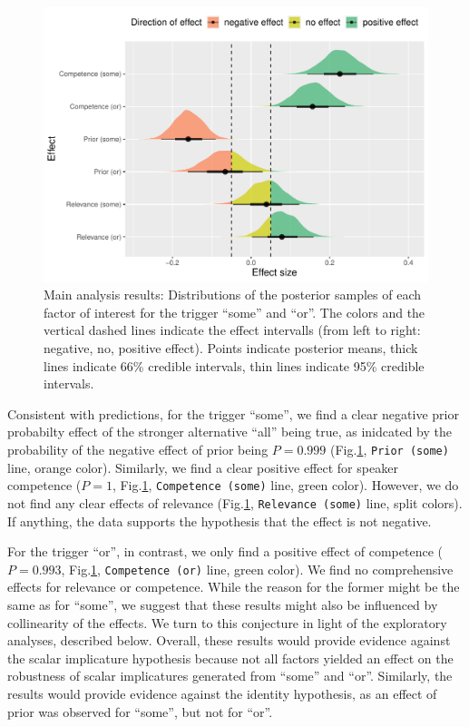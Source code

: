 \documentclass{sp}
\begin{document}
\begin{figure}[h]
	\begin{center}
		\includegraphics[width=1\linewidth]{images/posterior-effects-main.pdf}
	\end{center}
	\vspace{-0.3cm}
	\caption{Main analysis results: Distributions of the posterior samples of each factor of interest for the trigger ``some'' and ``or''. The colors and the vertical dashed lines indicate the effect intervalls (from left to right: negative, no, positive effect). Points indicate posterior means, thick lines indicate 66\% credible intervals, thin lines indicate 95\% credible intervals.}
	\label{posteriors-main}
\end{figure}

Consistent with predictions, for the trigger ``some'', we find a clear negative prior probabilty effect of the stronger alternative ``all'' being true, as inidcated by the probability of the negative effect of prior being $P = 0.999$ (Fig.\ref{posteriors-main}, \texttt{Prior~(some)} line, orange color). Similarly, we find a clear positive effect for speaker competence ($P =  1$, Fig.\ref{posteriors-main}, \texttt{Competence~(some)} line, green color). However, we do not find any clear effects of relevance (Fig.\ref{posteriors-main}, \texttt{Relevance~(some)} line, split colors). If anything, the data supports the hypothesis that the effect is not negative.

For the trigger ``or'', in contrast, we only find a positive effect of competence ($P =  0.993$, Fig.\ref{posteriors-main}, \texttt{Competence~(or)} line, green color).  We find no comprehensive effects for relevance or competence. While the reason for the former might be the same as for ``some'', we suggest that these results might also be influenced by collinearity of the effects. We turn to this conjecture in light of the exploratory analyses, described below. 
Overall, these results would provide evidence against the scalar implicature hypothesis because not all factors yielded an effect on the robustness of scalar implicatures generated from ``some'' and ``or''. Similarly, the results would provide evidence against the identity hypothesis, as an effect of prior was observed for ``some'', but not for ``or''.
\end{document}
